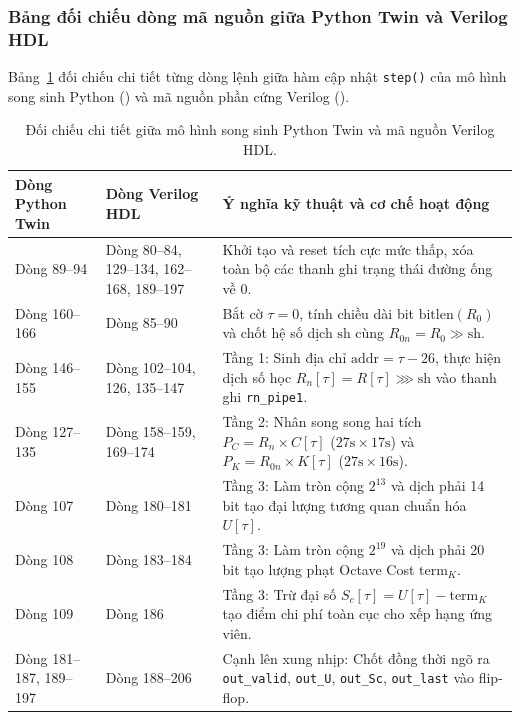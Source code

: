 \subsubsection*{Bảng đối chiếu dòng mã nguồn giữa Python Twin và Verilog HDL}
Bảng~\ref{tab:ch08_twin_vs_hdl} đối chiếu chi tiết từng dòng lệnh giữa hàm cập nhật \texttt{step()} của mô hình song sinh Python () và mã nguồn phần cứng Verilog ().

\begin{table}[htbp]
\centering
\small
\caption{Đối chiếu chi tiết giữa mô hình song sinh Python Twin và mã nguồn Verilog HDL.}
\label{tab:ch08_twin_vs_hdl}
\begin{tabularx}{\textwidth}{p{3.2cm} p{3.2cm} X}
\toprule
\textbf{Dòng Python Twin} & \textbf{Dòng Verilog HDL} & \textbf{Ý nghĩa kỹ thuật và cơ chế hoạt động} \\
\midrule
Dòng 89--94 & Dòng 80--84, 129--134, 162--168, 189--197 & Khởi tạo và reset tích cực mức thấp, xóa toàn bộ các thanh ghi trạng thái đường ống về 0. \\
\addlinespace[3pt]
Dòng 160--166 & Dòng 85--90 & Bắt cờ $\tau = 0$, tính chiều dài bit $\text{bitlen}(R_0)$ và chốt hệ số dịch $\text{sh}$ cùng $R_{0n} = R_0 \gg \text{sh}$. \\
\addlinespace[3pt]
Dòng 146--155 & Dòng 102--104, 126, 135--147 & Tầng 1: Sinh địa chỉ $\text{addr} = \tau - 26$, thực hiện dịch số học $R_n[\tau] = R[\tau] \ggg \text{sh}$ vào thanh ghi \texttt{rn\_pipe1}. \\
\addlinespace[3pt]
Dòng 127--135 & Dòng 158--159, 169--174 & Tầng 2: Nhân song song hai tích $P_C = R_n \times C[\tau]$ ($27\text{s} \times 17\text{s}$) và $P_K = R_{0n} \times K[\tau]$ ($27\text{s} \times 16\text{s}$). \\
\addlinespace[3pt]
Dòng 107 & Dòng 180--181 & Tầng 3: Làm tròn cộng $2^{13}$ và dịch phải 14 bit tạo đại lượng tương quan chuẩn hóa $U[\tau]$. \\
\addlinespace[3pt]
Dòng 108 & Dòng 183--184 & Tầng 3: Làm tròn cộng $2^{19}$ và dịch phải 20 bit tạo lượng phạt Octave Cost $\text{term}_K$. \\
\addlinespace[3pt]
Dòng 109 & Dòng 186 & Tầng 3: Trừ đại số $S_c[\tau] = U[\tau] - \text{term}_K$ tạo điểm chi phí toàn cục cho xếp hạng ứng viên. \\
\addlinespace[3pt]
Dòng 181--187, 189--197 & Dòng 188--206 & Cạnh lên xung nhịp: Chốt đồng thời ngõ ra \texttt{out\_valid}, \texttt{out\_U}, \texttt{out\_Sc}, \texttt{out\_last} vào flip-flop. \\
\bottomrule
\end{tabularx}
\end{table}

